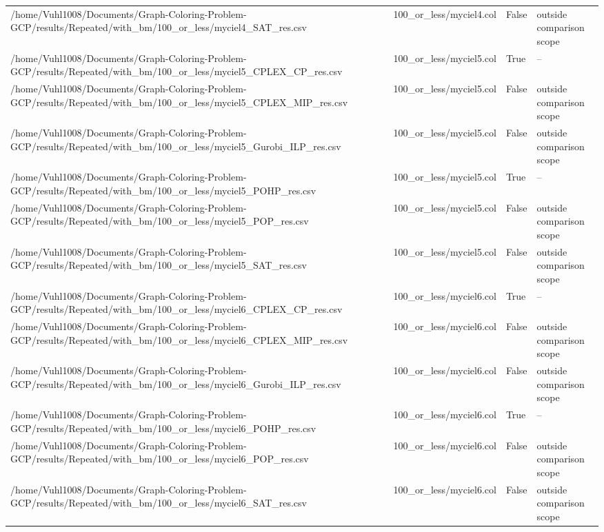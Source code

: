 \begin{table}[htbp]
\begin{tabular}{llll}
/home/Vuhl1008/Documents/Graph-Coloring-Problem-GCP/results/Repeated/with\_bm/100\_or\_less/myciel4\_SAT\_res.csv & 100\_or\_less/myciel4.col & False & outside comparison scope \\
/home/Vuhl1008/Documents/Graph-Coloring-Problem-GCP/results/Repeated/with\_bm/100\_or\_less/myciel5\_CPLEX\_CP\_res.csv & 100\_or\_less/myciel5.col & True & -- \\
/home/Vuhl1008/Documents/Graph-Coloring-Problem-GCP/results/Repeated/with\_bm/100\_or\_less/myciel5\_CPLEX\_MIP\_res.csv & 100\_or\_less/myciel5.col & False & outside comparison scope \\
/home/Vuhl1008/Documents/Graph-Coloring-Problem-GCP/results/Repeated/with\_bm/100\_or\_less/myciel5\_Gurobi\_ILP\_res.csv & 100\_or\_less/myciel5.col & False & outside comparison scope \\
/home/Vuhl1008/Documents/Graph-Coloring-Problem-GCP/results/Repeated/with\_bm/100\_or\_less/myciel5\_POHP\_res.csv & 100\_or\_less/myciel5.col & True & -- \\
/home/Vuhl1008/Documents/Graph-Coloring-Problem-GCP/results/Repeated/with\_bm/100\_or\_less/myciel5\_POP\_res.csv & 100\_or\_less/myciel5.col & False & outside comparison scope \\
/home/Vuhl1008/Documents/Graph-Coloring-Problem-GCP/results/Repeated/with\_bm/100\_or\_less/myciel5\_SAT\_res.csv & 100\_or\_less/myciel5.col & False & outside comparison scope \\
/home/Vuhl1008/Documents/Graph-Coloring-Problem-GCP/results/Repeated/with\_bm/100\_or\_less/myciel6\_CPLEX\_CP\_res.csv & 100\_or\_less/myciel6.col & True & -- \\
/home/Vuhl1008/Documents/Graph-Coloring-Problem-GCP/results/Repeated/with\_bm/100\_or\_less/myciel6\_CPLEX\_MIP\_res.csv & 100\_or\_less/myciel6.col & False & outside comparison scope \\
/home/Vuhl1008/Documents/Graph-Coloring-Problem-GCP/results/Repeated/with\_bm/100\_or\_less/myciel6\_Gurobi\_ILP\_res.csv & 100\_or\_less/myciel6.col & False & outside comparison scope \\
/home/Vuhl1008/Documents/Graph-Coloring-Problem-GCP/results/Repeated/with\_bm/100\_or\_less/myciel6\_POHP\_res.csv & 100\_or\_less/myciel6.col & True & -- \\
/home/Vuhl1008/Documents/Graph-Coloring-Problem-GCP/results/Repeated/with\_bm/100\_or\_less/myciel6\_POP\_res.csv & 100\_or\_less/myciel6.col & False & outside comparison scope \\
/home/Vuhl1008/Documents/Graph-Coloring-Problem-GCP/results/Repeated/with\_bm/100\_or\_less/myciel6\_SAT\_res.csv & 100\_or\_less/myciel6.col & False & outside comparison scope \\

\end{tabular}
\end{table}
